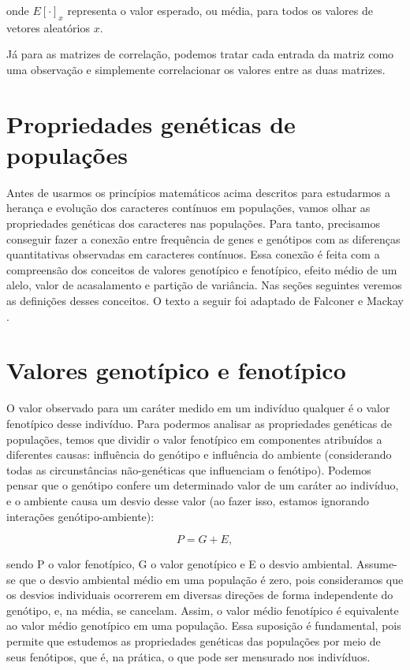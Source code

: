 \documentclass[portuges,]{tufte-handout}
\begin{document}
onde \(E[\cdot]_x\) representa o valor esperado, ou média, para todos os
valores de vetores aleatórios \(x\).

Já para as matrizes de correlação, podemos tratar cada entrada da matriz
como uma observação e simplemente correlacionar os valores entre as duas
matrizes.

\section{Propriedades genéticas de
populações}\label{propriedades-genuxe9ticas-de-populauxe7uxf5es}

Antes de usarmos os princípios matemáticos acima descritos para
estudarmos a herança e evolução dos caracteres contínuos em populações,
vamos olhar as propriedades genéticas dos caracteres nas populações.
Para tanto, precisamos conseguir fazer a conexão entre frequência de
genes e genótipos com as diferenças quantitativas observadas em
caracteres contínuos. Essa conexão é feita com a compreensão dos
conceitos de valores genotípico e fenotípico, efeito médio de um alelo,
valor de acasalamento e partição de variância. Nas seções seguintes
veremos as definições desses conceitos. O texto a seguir foi adaptado de
Falconer e Mackay \cite{Falconer1996}.

\section{Valores genotípico e
fenotípico}\label{valores-genotuxedpico-e-fenotuxedpico}

O valor observado para um caráter medido em um indivíduo qualquer é o
valor fenotípico desse indivíduo. Para podermos analisar as propriedades
genéticas de populações, temos que dividir o valor fenotípico em
componentes atribuídos a diferentes causas: influência do genótipo e
influência do ambiente (considerando todas as circunstâncias
não-genéticas que influenciam o fenótipo). Podemos pensar que o genótipo
confere um determinado valor de um caráter ao indivíduo, e o ambiente
causa um desvio desse valor (ao fazer isso, estamos ignorando interações
genótipo-ambiente):

\[
P = G + E,
\]

sendo P o valor fenotípico, G o valor genotípico e E o desvio ambiental.
Assume-se que o desvio ambiental médio em uma população é zero, pois
consideramos que os desvios individuais ocorrerem em diversas direções
de forma independente do genótipo, e, na média, se cancelam. Assim, o
valor médio fenotípico é equivalente ao valor médio genotípico em uma
população. Essa suposição é fundamental, pois permite que estudemos as
propriedades genéticas das populações por meio de seus fenótipos, que é,
na prática, o que pode ser mensurado nos indivíduos.
\end{document}
